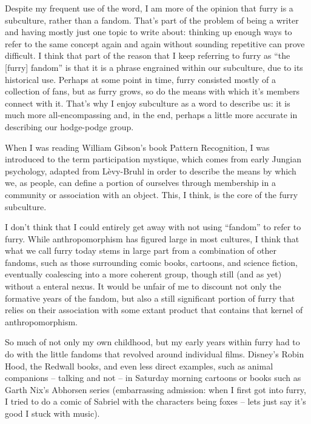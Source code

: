 
Despite my frequent use of the word, I am more of the opinion that furry is a subculture, rather than a fandom. That's part of the problem of being a writer and having mostly just one topic to write about: thinking up enough ways to refer to the same concept again and again without sounding repetitive can prove difficult. I think that part of the reason that I keep referring to furry as ``the [furry] fandom'' is that it is a phrase engrained within our subculture, due to its historical use.  Perhaps at some point in time, furry consisted mostly of a collection of fans, but as furry grows, so do the means with which it's members connect with it.  That's why I enjoy subculture as a word to describe us: it is much more all-encompassing and, in the end, perhaps a little more accurate in describing our hodge-podge group.

When I was reading William Gibson's book Pattern Recognition, I was introduced to the term participation mystique, which comes from early Jungian psychology, adapted from L\`{e}vy-Bruhl in order to describe the means by which we, as people, can define a portion of ourselves through membership in a community or association with an object.  This, I think, is the core of the furry subculture.

I don't think that I could entirely get away with not using ``fandom'' to refer to furry. While anthropomorphism has figured large in most cultures, I think that what we call furry today stems in large part from a combination of other fandoms, such as those surrounding comic books, cartoons, and science fiction, eventually coalescing into a more coherent group, though still (and as yet) without a enteral nexus. It would be unfair of me to discount not only the formative years of the fandom, but also a still significant portion of furry that relies on their association with some extant product that contains that kernel of anthropomorphism.

So much of not only my own childhood, but my early years within furry had to do with the little fandoms that revolved around individual films.  Disney's Robin Hood, the Redwall books, and even less direct examples, such as animal companions -- talking and not -- in Saturday morning cartoons or books such as Garth Nix's Abhorsen series (embarrassing admission: when I first got into furry, I tried to do a comic of Sabriel with the characters being foxes -- lets just say it's good I stuck with music).

